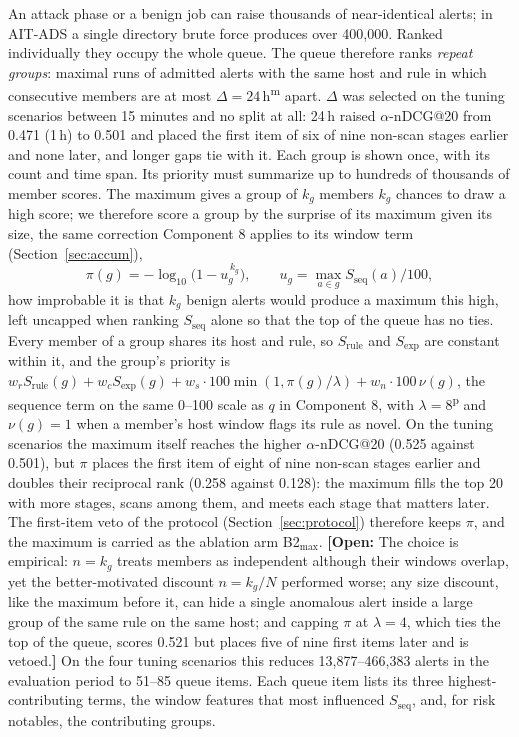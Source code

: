\documentclass[conference]{IEEEtran}
\newcommand{\open}[1]{\textcolor{blue!70!black}{\textbf{[Open:} #1\textbf{]}}}
\newcommand{\prov}{\textsuperscript{\textcolor{orange!80!black}{p}}}   %
\newcommand{\meas}{\textsuperscript{\textcolor{green!45!black}{m}}}    %
\begin{document}
An attack phase or a benign job can raise thousands of near-identical alerts; in AIT-ADS a single directory brute force produces over 400{,}000. Ranked individually they occupy the whole queue. The queue therefore ranks \emph{repeat groups}: maximal runs of admitted alerts with the same host and rule in which consecutive members are at most $\Delta = 24$\,h\meas{} apart. $\Delta$ was selected on the tuning scenarios between 15 minutes and no split at all: 24\,h raised $\alpha$-nDCG@20 from 0.471 (1\,h) to 0.501 and placed the first item of six of nine non-scan stages earlier and none later, and longer gaps tie with it. Each group is shown once, with its count and time span. Its priority must summarize up to hundreds of thousands of member scores. The maximum gives a group of $k_g$ members $k_g$ chances to draw a high score; we therefore score a group by the surprise of its maximum given its size, the same correction Component 8 applies to its window term (Section~\ref{sec:accum}),
\begin{equation}
\pi(g) = -\log_{10}\!\big(1 - u_g^{\,k_g}\big), \qquad u_g = \max_{a \in g} S_\mathrm{seq}(a)/100,
\end{equation}
how improbable it is that $k_g$ benign alerts would produce a maximum this high, left uncapped when ranking $S_\mathrm{seq}$ alone so that the top of the queue has no ties. Every member of a group shares its host and rule, so $S_\mathrm{rule}$ and $S_\mathrm{exp}$ are constant within it, and the group's priority is $w_r S_\mathrm{rule}(g) + w_c S_\mathrm{exp}(g) + w_s \cdot 100 \min(1, \pi(g)/\lambda) + w_n \cdot 100\,\nu(g)$, the sequence term on the same 0--100 scale as $q$ in Component 8, with $\lambda = 8$\prov{} and $\nu(g) = 1$ when a member's host window flags its rule as novel. On the tuning scenarios the maximum itself reaches the higher $\alpha$-nDCG@20 (0.525 against 0.501), but $\pi$ places the first item of eight of nine non-scan stages earlier and doubles their reciprocal rank (0.258 against 0.128): the maximum fills the top 20 with more stages, scans among them, and meets each stage that matters later. The first-item veto of the protocol (Section~\ref{sec:protocol}) therefore keeps $\pi$, and the maximum is carried as the ablation arm B2$_\mathrm{max}$. \open{The choice is empirical: $n = k_g$ treats members as independent although their windows overlap, yet the better-motivated discount $n = k_g/N$ performed worse; any size discount, like the maximum before it, can hide a single anomalous alert inside a large group of the same rule on the same host; and capping $\pi$ at $\lambda = 4$, which ties the top of the queue, scores 0.521 but places five of nine first items later and is vetoed.} On the four tuning scenarios this reduces 13{,}877--466{,}383 alerts in the evaluation period to 51--85 queue items. Each queue item lists its three highest-contributing terms, the window features that most influenced $S_\mathrm{seq}$, and, for risk notables, the contributing groups.
\end{document}
